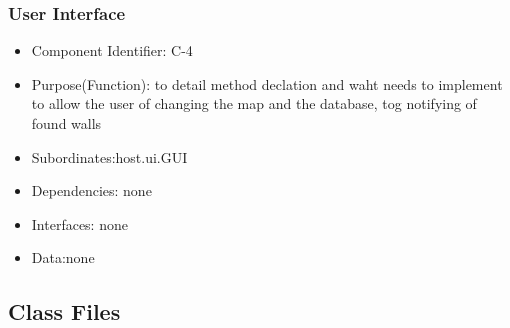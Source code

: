 \documentclass[11pt, a4paper]{report}
\begin{document}
\subsubsection{User Interface}
\begin{itemize}
\item Component Identifier: C-4
\item Purpose(Function): to detail method declation and waht needs to implement 
 to allow the user of changing the map and the database, tog notifying of found walls
\item Subordinates:host.ui.GUI
\item Dependencies: none
\item Interfaces: none
\item Data:none
\end{itemize}
\subsection{Class Files}
\end{document}
